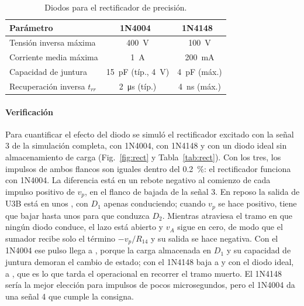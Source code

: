 \begin{table}[!htb]
\centering
\caption{Diodos para el rectificador de precisión.}
\label{tab:diodos}
\footnotesize
\begin{tabular}{@{}lcc@{}}
\toprule
\textbf{Parámetro} & \textbf{1N4004}~\cite{1n4004} & \textbf{1N4148}~\cite{1n4148} \\
\midrule
Tensión inversa máxima & \SI{400}{\volt} & \SI{100}{\volt} \\
Corriente media máxima & \SI{1}{\ampere} & \SI{200}{\milli\ampere} \\
Capacidad de juntura & \SI{15}{\pico\farad} (típ., \SI{4}{\volt}) & \SI{4}{\pico\farad} (máx.) \\
Recuperación inversa $t_{rr}$ & \SI{2}{\micro\second} (típ.) & \SI{4}{\nano\second} (máx.) \\
\bottomrule
\end{tabular}
\end{table}

\paragraph*{Verificación} Para cuantificar el efecto del diodo se simuló el rectificador excitado con la señal 3 de la simulación completa, con 1N4004, con 1N4148 y con un diodo ideal sin almacenamiento de carga (Fig.~\ref{fig:rect} y Tabla~\ref{tab:rect}). Con los tres, los impulsos de ambos flancos son iguales dentro del \SI{0,2}{\percent}: el rectificador funciona con 1N4004. La diferencia está en un rebote negativo al comienzo de cada impulso positivo de $v_p$, en el flanco de bajada de la señal 3. En reposo la salida de U3B está en unos , con $D_1$ apenas conduciendo; cuando $v_p$ se hace positivo, tiene que bajar hasta unos  para que conduzca $D_2$. Mientras atraviesa el tramo en que ningún diodo conduce, el lazo está abierto y $v_A$ sigue en cero, de modo que el sumador recibe solo el término $-v_p/R_{14}$ y su salida se hace negativa. Con el 1N4004 ese pulso llega a , porque la carga almacenada en $D_1$ y su capacidad de juntura demoran el cambio de estado; con el 1N4148 baja a  y con el diodo ideal, a , que es lo que tarda el operacional en recorrer el tramo muerto. El 1N4148 sería la mejor elección para impulsos de pocos microsegundos, pero el 1N4004 da una señal 4 que cumple la consigna.

